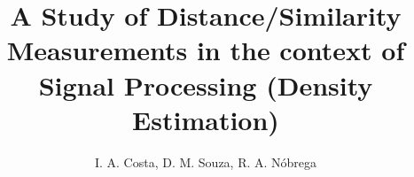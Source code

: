 \documentclass[conference]{IEEEtran}
\begin{document}
%
%
\title{A Study of Distance/Similarity Measurements in the context of Signal Processing (Density Estimation)}
%
%
%

\author{I. A. Costa,
			  D. M. Souza,
             R. A. N\'obrega%

}


%
%
\end{document}

